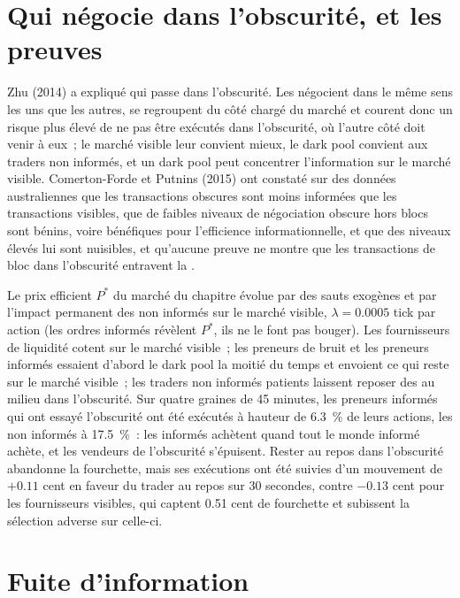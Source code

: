 \section{Qui négocie dans l'obscurité, et les preuves}

Zhu (2014) a expliqué qui passe dans l'obscurité. Les  négocient dans le même sens les uns que les autres, se regroupent du côté chargé du marché et courent donc un
risque plus élevé de ne pas être exécutés dans l'obscurité, où l'autre côté doit venir à eux~; le marché visible leur convient mieux, le dark pool convient aux
traders non informés, et un dark pool peut concentrer l'information sur le marché visible. Comerton-Forde et Putnins (2015) ont constaté sur des données australiennes que les transactions obscures
sont moins informées que les transactions visibles, que de faibles niveaux de négociation obscure hors blocs sont bénins, voire bénéfiques pour l'efficience informationnelle, et que des niveaux élevés
lui sont nuisibles, et qu'aucune preuve ne montre que les transactions de bloc dans l'obscurité entravent la .

Le prix efficient $P^\ast$ du marché du chapitre évolue par des sauts exogènes et par l'impact permanent des  non informés sur le
marché visible, $\lambda=0.0005$ tick par action (les ordres informés révèlent $P^\ast$, ils ne le font pas bouger). Les fournisseurs de liquidité cotent sur le marché visible~; les preneurs de bruit et
les preneurs informés essaient d'abord le dark pool la moitié du temps et envoient ce qui reste sur le marché visible~; les traders non informés patients laissent reposer des  au milieu dans l'obscurité. Sur quatre
graines de 45 minutes, les preneurs informés qui ont essayé l'obscurité ont été exécutés à hauteur de 6.3~\% de leurs actions, les non informés à 17.5~\%~: les informés achètent quand
tout le monde informé achète, et les vendeurs de l'obscurité s'épuisent. Rester au repos dans l'obscurité abandonne la fourchette, mais ses exécutions ont été suivies d'un mouvement de $+0.11$ cent en
faveur du trader au repos sur 30 secondes, contre $-0.13$ cent pour les fournisseurs visibles, qui captent 0.51 cent de fourchette et subissent la sélection adverse sur celle-ci.

\section{Fuite d'information}

